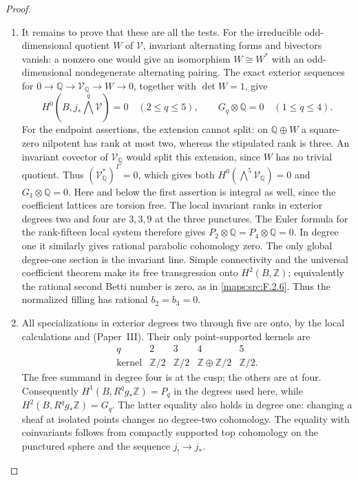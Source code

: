 \documentclass[11pt,a4paper]{article}
\theoremstyle{definition}
\newcommand{\ExternalPaperRef}[3]{\ifmmode\text{\upshape #1#2 (Paper~#3)}\else #1#2 (Paper~#3)\fi}
\begin{document}
\begin{proof}
\begin{enumerate}[label=\arabic*.]
\item It remains to prove that these are all the tests.
For the irreducible odd-dimensional quotient $W$
of $\mathcal V$, invariant alternating forms and
bivectors vanish: a nonzero one would give an
isomorphism $W\cong W^*$ with an odd-dimensional
nondegenerate alternating pairing.
The exact exterior sequences for
$0\to\mathbb Q\to\mathcal V_{\mathbb Q}\to W\to0$,
together with $\det W=1$, give
\[
 H^0(B,j_*\bigwedge^q\mathcal V)=0
       \quad(2\le q\le5),\qquad
 G_q\otimes\mathbb Q=0\quad(1\le q\le4).
 \tag{F.HC8}\label{maps:eq:F.HC8}
\]
For the endpoint assertions, the extension cannot split:
on $\mathbb Q\oplus W$ a square-zero nilpotent has rank at
most two, whereas the stipulated rank is three.
An invariant covector of $\mathcal V_{\mathbb Q}$ would
split this extension, since $W$ has no trivial quotient.
Thus $(\mathcal V_{\mathbb Q}^*)^\Gamma=0$, which gives
both $H^0(\bigwedge^5\mathcal V_{\mathbb Q})=0$ and
$G_1\otimes\mathbb Q=0$.
Here and below the first assertion is integral as well,
since the coefficient lattices are torsion free.
The local invariant ranks in exterior degrees two
and four are $3,3,9$ at the three punctures.
The Euler formula for the rank-fifteen local system
therefore gives $P_2\otimes\mathbb Q=P_4\otimes\mathbb Q=0$.
In degree one it similarly gives rational parabolic
cohomology zero.
The only global degree-one section is the invariant
line.  Simple connectivity and the universal
coefficient theorem make its free transgression
onto $H^2(B,\mathbb Z)$; equivalently the rational
second Betti number is zero, as in \ref{maps:src:F.2.6}.
Thus the normalized filling has rational $b_2=b_3=0$.

\item All specializations in exterior degrees two through
five are onto, by the local calculations and \ExternalPaperRef{}{6.3}{III}.
Their only point-supported kernels are
\[
\begin{array}{c|cccc}
q&2&3&4&5\\ \hline
\text{kernel}&\mathbb Z/2&\mathbb Z/2&
                 \mathbb Z\oplus\mathbb Z/2&\mathbb Z/2 .
\end{array}
\tag{F.HC9}\label{maps:eq:F.HC9}
\]
The free summand in degree four is at the cusp; the
others are at four.
Consequently $H^1(B,R^qg_*\mathbb Z)=P_q$ in the
degrees used here, while
$H^2(B,R^qg_*\mathbb Z)=G_q$.
The latter equality also holds in degree one:
changing a sheaf at isolated points changes no
degree-two cohomology.  The equality with coinvariants
follows from compactly supported top cohomology on
the punctured sphere and the sequence $j_!\to j_*$.


\end{enumerate}
\end{proof}
\end{document}

